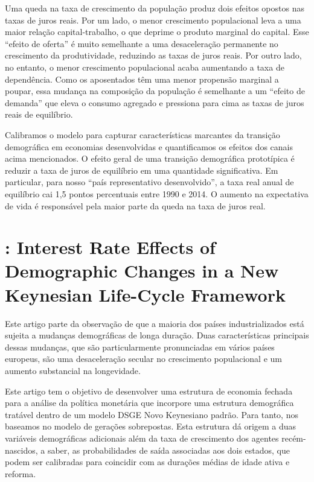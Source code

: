 Uma queda na taxa de crescimento da população produz dois efeitos opostos nas taxas de juros reais. Por um lado, o menor crescimento populacional leva a uma maior relação capital-trabalho, o que deprime o produto marginal do capital. Esse “efeito de oferta” é muito semelhante a uma desaceleração permanente no crescimento da produtividade, reduzindo as taxas de juros reais. Por outro lado, no entanto, o menor crescimento populacional acaba aumentando a taxa de dependência. Como os aposentados têm uma menor propensão marginal a poupar, essa mudança na composição da população é semelhante a um “efeito de demanda” que eleva o consumo agregado e pressiona para cima as taxas de juros reais de equilíbrio.

Calibramos o modelo para capturar características marcantes da transição demográfica em economias desenvolvidas e quantificamos os efeitos dos canais acima mencionados. O efeito geral de uma transição demográfica prototípica é reduzir a taxa de juros de equilíbrio em uma quantidade significativa. Em particular, para nosso “país representativo desenvolvido”, a taxa real anual de equilíbrio cai 1,5 pontos percentuais entre 1990 e 2014. O aumento na expectativa de vida é responsável pela maior parte da queda na taxa de juros real.
%
%
\section{\citet{Kara:2016}: Interest Rate Effects of Demographic Changes in a New Keynesian Life-Cycle Framework}
Este artigo parte da observação de que a maioria dos países industrializados está sujeita a mudanças demográficas de longa duração. Duas características principais dessas mudanças, que são particularmente pronunciadas em vários países europeus, são uma desaceleração secular no crescimento populacional e um aumento substancial na longevidade.

Este artigo tem o objetivo de desenvolver uma estrutura de economia fechada para a análise da política monetária que incorpore uma estrutura demográfica tratável dentro de um modelo DSGE Novo Keynesiano padrão. Para tanto, nos baseamos no modelo de gerações sobrepostas. Esta estrutura dá origem a duas variáveis demográficas adicionais além da taxa de crescimento dos agentes recém-nascidos, a saber, as probabilidades de saída associadas aos dois estados, que podem ser calibradas para coincidir com as durações médias de idade ativa e reforma.

